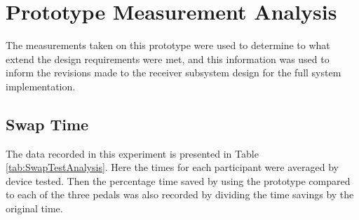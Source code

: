 \documentclass{article}
\begin{document}
\newpage
\section{Prototype Measurement Analysis}

	\color{black}

	The measurements taken on this prototype were used to determine to what extend the design requirements were met, and this information was used to inform the revisions made to the receiver subsystem design for the full system implementation.

	\subsection{Swap Time}
	The data recorded in this experiment is presented in Table \ref{tab:SwapTestAnalysis}.  Here the times for each participant were averaged by device tested.  Then the percentage time saved by using the prototype compared to each of the three pedals was also recorded by dividing the time savings by the original time.
\end{document}

